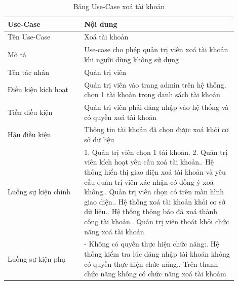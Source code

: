 \begin{longtable}[htp]{ |m{0.3\linewidth}|m{0.6\linewidth}|}
 \caption{Bảng Use-Case xoá tài khoản \label{long}}\\
 \hline
 Use-Case & Nội dung \\
 \hline
 Tên Use-Case & Xoá tài khoản \\
 \hline
 Mô tả & Use-case cho phép quản trị viên xoá tài khoản khi người dùng không sử dụng\\
 \hline
 Tên tác nhân & Quản trị viên\\
 \hline
 Điều kiện kích hoạt & Quản trị viên vào trang admin trên hệ thống, chọn 1 tài khoản trong danh sách tài khoản\\
 \hline
 Tiền điều kiện & Quản trị viên phải đăng nhập vào hệ thống và có quyền xoá tài khoản\\
 \hline
 Hậu điều kiện & Thông tin tài khoản đã chọn được xoá khỏi cơ sở dữ liệu\\
 \hline
 Luồng sự kiện chính & 
 1. Quản trị viên chọn 1 tài khoản.
 2. Quản trị viên kích hoạt yêu cầu xoá tài khoản.\newline
 3. Hệ thống hiển thị giao diện xoá tài khoản và yêu cầu quản trị viên xác nhận có đồng ý xoá không.\newline
 4. Quản trị viên chọn có trên màn hình giao diện.\newline
 5. Hệ thống xoá tài khoản khỏi cơ sở dữ liệu.\newline
 6. Hệ thống thông báo đã xoá thành công tài khoản.\newline	
 7. Quản trị viên thoát khỏi chức năng xoá tài khoản
 \\
 \hline
 Luồng sự kiện phụ & 
 - Không có quyền thực hiện chức năng:\newline
  1. Hệ thống kiểm tra lúc đăng nhập tài khoản không có quyền thực hiện chức năng.\newline
  2. Trên thanh chức năng không có chức năng xoá tài khoảm
 \\
 \hline
\end{longtable}

